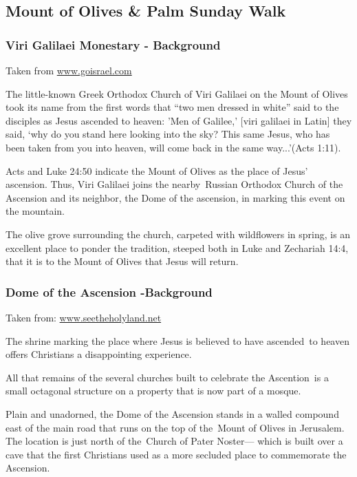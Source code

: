 \documentclass[letterpaper]{report}
\begin{document}
\subsection{Mount of Olives \& Palm Sunday Walk}
\begin{multicols}{2}
\subsubsection{Viri Galilaei Monestary - Background}
Taken from \href{http://www.goisrael.com/Tourism_Eng/Tourist%20Information/Christian%20Themes/Details/Pages/Viri%20Galilaei.aspx}{
www.goisrael.com}

The little-known Greek Orthodox Church of Viri Galilaei on the Mount of Olives took its name from the first words that “two men dressed in white” said to the disciples as Jesus ascended to heaven: ’Men of Galilee,’ [viri galilaei in Latin] they said, ‘why do you stand here looking into the sky? This same Jesus, who has been taken from you into heaven, will come back in the same way...’(Acts 1:11). 

Acts and Luke 24:50 indicate the Mount of Olives as the place of Jesus’ ascension. Thus, Viri Galilaei joins the nearby Russian Orthodox Church of the Ascension and its neighbor, the Dome of the ascension, in marking this event on the mountain. 

The olive grove surrounding the church, carpeted with wildflowers in spring, is an excellent place to ponder the tradition, steeped both in Luke and Zechariah 14:4, that it is to the Mount of Olives that Jesus will return. 

\subsubsection{Dome of the Ascension -Background}

Taken from:
\href{http://www.seetheholyland.net/dome-of-the-ascension/}{www.seetheholyland.net}

The shrine marking the place where Jesus is believed to have ascended to heaven offers Christians a disappointing experience.

All that remains of the several churches built to celebrate the Ascention is a small octagonal structure on a property that is now part of a mosque.

Plain and unadorned, the Dome of the Ascension stands in a walled compound east of the main road that runs on the top of the Mount of Olives in Jerusalem. The location is just north of the Church of Pater Noster— which is built over a cave that the first Christians used as a more secluded place to commemorate the Ascension.


\end{multicols}
\end{document}
